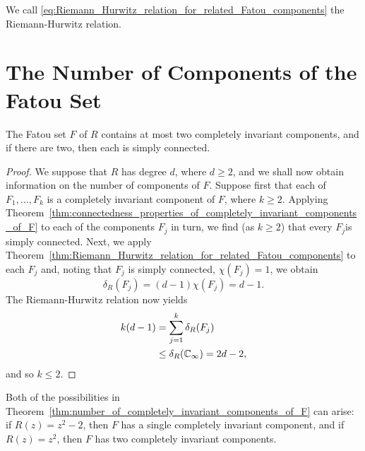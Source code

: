 \begin{remark}
    We call \eqref{eq:Riemann_Hurwitz_relation_for_related_Fatou_components}
    the Riemann-Hurwitz relation.
\end{remark}

\section{The Number of Components of the Fatou Set}
\label{sec:the_number_of_components_of_the_Fatou_set}

\begin{theorem}
    \label{thm:number_of_completely_invariant_components_of_F}
    The Fatou set $F$ of $R$ contains at most two completely invariant
    components, and if there are two, then each is simply connected.
\end{theorem}
\begin{proof}
    We suppose that $R$ has degree $d$, where $d \geq 2$, and we shall now
    obtain information on the number of components of $F$. Suppose first that
    each of $F_1, \dots, F_k$ is a completely invariant component of $F$, where
    $k \geq 2$. Applying
    Theorem~\ref{thm:connectedness_properties_of_completely_invariant_components_of_F}
    to each of the components $F_j$ in turn, we find  (as $k \geq 2$) that every
    $F_j$is simply connected. Next, we apply
    Theorem~\ref{thm:Riemann_Hurwitz_relation_for_related_Fatou_components} to
    each $F_j$ and, noting that $F_j$ is simply connected, $\chi(F_j) = 1$, we
    obtain
    \begin{equation*}
        \delta_R(F_j) = (d - 1) \chi(F_j) = d - 1.
    \end{equation*}
    The Riemann-Hurwitz relation now yields
    \begin{align*}
        k (d - 1) &= \sum_{j=1}^k \delta_R(F_j) \\
                &\leq \delta_R(\mathbb{C}_\infty) = 2d - 2,
    \end{align*}
    and so $k \leq 2$.
\end{proof}

\begin{example}
    Both of the possibilities in
    Theorem~\ref{thm:number_of_completely_invariant_components_of_F} can arise:
    if $R(z) = z^2 - 2$, then $F$ has a single completely invariant component,
    and if $R(z) = z^2$, then $F$ has two completely invariant components.
\end{example}

